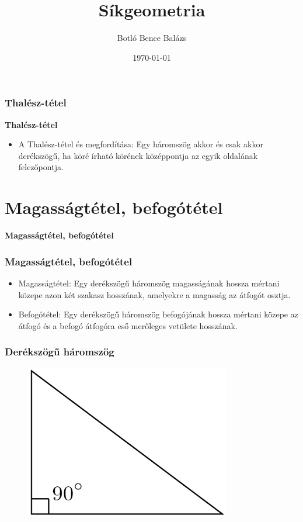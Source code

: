 \documentclass[11pt]{beamer}
\title{Síkgeometria}
\author{Botló Bence Balázs}
\institute{Selye János Egyetem}
\date{\today}
\begin{document}
\frame{\maketitle}
\frame{\tableofcontents}
\begin{frame}[<+->]
\frametitle{Thalész-tétel}
\begin{block}{\textbf{Thalész-tétel}}
\begin{itemize}[label=$\circ$]
\item A Thalész-tétel és megfordítása: Egy háromszög akkor és csak akkor derékszögű, ha köré írható körének középpontja az egyik oldalának felezőpontja.
\end{itemize}
\end{block}
\end{frame}

\section{\textbf{Magasságtétel, befogótétel}}
\begin{frame}[<+->]
\begin{block}{\textbf{Magasságtétel, befogótétel}}
\frametitle{Magasságtétel, befogótétel}
\begin{itemize}[label=$\circ$]
\item Magasságtétel: Egy derékszögű háromszög magasságának hossza mértani közepe azon két szakasz hosszának, amelyekre a magasság az átfogót osztja.
\item Befogótétel: Egy derékszögű háromszög befogójának hossza mértani közepe az átfogó és a befogó átfogóra eső merőleges vetülete hosszának.
\end{itemize}
\end{block}
\end{frame}

\begin{frame}
\frametitle{Derékszögű háromszög}
\begin{figure}
  \includegraphics[width=0.8\textwidth]{right_triangle.png}
\end{figure}
\end{frame}
\end{document}
